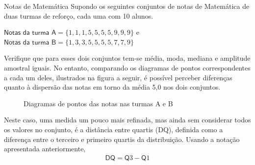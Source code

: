 \begin{example}{Notas de Matemática}
Supondo os seguintes conjuntos de notas de Matemática de duas turmas de reforço, cada uma com 10 alunos.

\(\textsf{Notas da turma A}=\{ 1,1,1,5,5,5,5,9,9,9\}\) e \(\textsf{Notas da turma B}=\{1,3,3,5,5,5,5,7,7,9\}\)

Verifique que para esses dois conjuntos tem-se média, moda, mediana e amplitude amostral iguais. No entanto, comparando os diagramas de pontos correspondentes a cada um deles, ilustrados na figura a seguir, é possível perceber diferenças quanto à dispersão das notas em torno da média 5,0 nos dois conjuntos.

\begin{figure}[H]
\centering
\capstart



\caption{Diagramas de pontos das notas nas turmas A e B}\label{\detokenize{PE104-4:fig-diagrama-de-pontos-notas}}\label{\detokenize{PE104-4:id2}}\end{figure}


Neste caso, uma medida um pouco mais refinada, mas ainda sem considerar todos os valores no conjunto, é a distância entre quartis (DQ), definida como a diferença entre o terceiro e primeiro quartis da distribuição. Usando a notação apresentada anteriormente,
\begin{equation*}
\begin{split}\textsf{DQ}=\textsf{Q}3-\textsf{Q}1\end{split}
\end{equation*}
\end{example}

